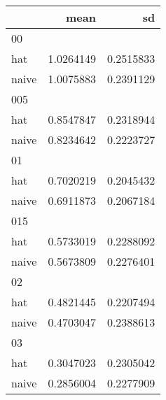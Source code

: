 \captionsetup[table]{labelformat=empty,skip=1pt}
\begin{longtable}{lrr}
\toprule
 & mean & sd \\ 
\midrule
\multicolumn{1}{l}{00} \\ 
\midrule
hat & 1.0264149 & 0.2515833 \\ 
naive & 1.0075883 & 0.2391129 \\ 
\midrule
\multicolumn{1}{l}{005} \\ 
\midrule
hat & 0.8547847 & 0.2318944 \\ 
naive & 0.8234642 & 0.2223727 \\ 
\midrule
\multicolumn{1}{l}{01} \\ 
\midrule
hat & 0.7020219 & 0.2045432 \\ 
naive & 0.6911873 & 0.2067184 \\ 
\midrule
\multicolumn{1}{l}{015} \\ 
\midrule
hat & 0.5733019 & 0.2288092 \\ 
naive & 0.5673809 & 0.2276401 \\ 
\midrule
\multicolumn{1}{l}{02} \\ 
\midrule
hat & 0.4821445 & 0.2207494 \\ 
naive & 0.4703047 & 0.2388613 \\ 
\midrule
\multicolumn{1}{l}{03} \\ 
\midrule
hat & 0.3047023 & 0.2305042 \\ 
naive & 0.2856004 & 0.2277909 \\ 
 \bottomrule
\end{longtable}

